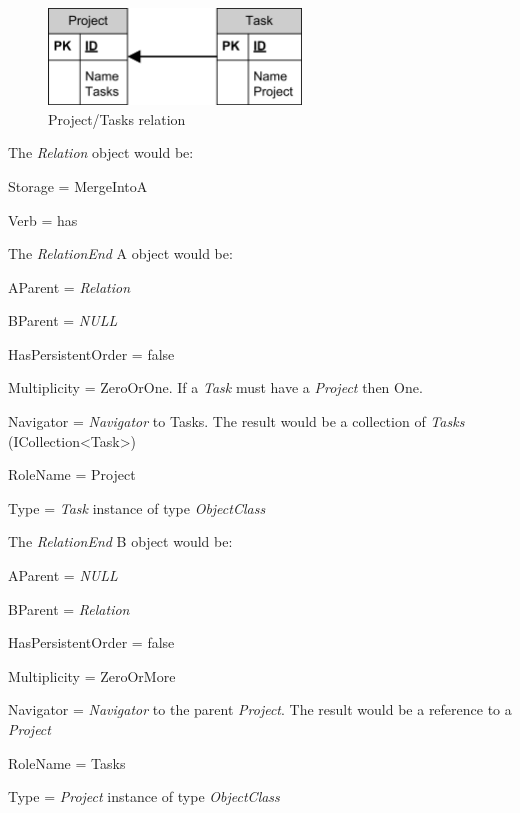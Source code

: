 \begin{figure}[ht]
	\begin{center}
		\includegraphics[width=0.6\textwidth]{images/Rel_1_n_Project_Tasks.png}
		\caption{Project/Tasks relation}
		\label{project_tasks_relation}
	\end{center}
\end{figure}

The \emph{Relation} object would be:
\begin{descriptionBorder}
	\item[Storage] 		{ = MergeIntoA }
	\item[Verb] 		{ = has }
\end{descriptionBorder}

The \emph{RelationEnd} A object would be:
\begin{descriptionBorder}
	\item[AParent] { = \emph{Relation}  }
	\item[BParent] { = \emph{NULL} }
	\item[HasPersistentOrder] { = false  }
	\item[Multiplicity] { = ZeroOrOne. If a \emph{Task} must have a \emph{Project} then One. }
	\item[Navigator] { = \emph{Navigator} to Tasks. The result would be a collection of \emph{Tasks} (ICollection\textless Task\textgreater) }
	\item[RoleName] { = Project }
	\item[Type] { = \emph{Task} instance of type \emph{ObjectClass} }
\end{descriptionBorder}

The \emph{RelationEnd} B object would be:
\begin{descriptionBorder}
	\item[AParent] { =  \emph{NULL} }
	\item[BParent] { = \emph{Relation} }
	\item[HasPersistentOrder] { = false  }
	\item[Multiplicity] { = ZeroOrMore }
	\item[Navigator] { = \emph{Navigator} to the parent \emph{Project}. The result would be a reference to a \emph{Project}  }
	\item[RoleName] { = Tasks }
	\item[Type] { = \emph{Project} instance of type \emph{ObjectClass} }
\end{descriptionBorder}

